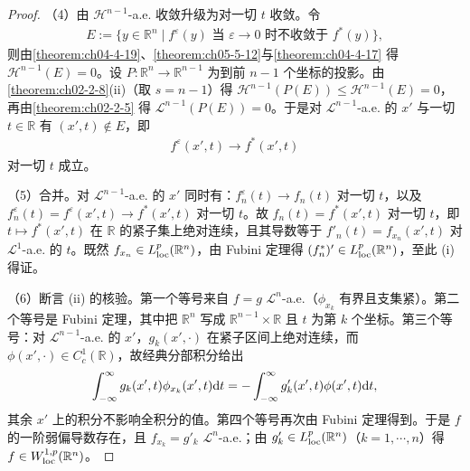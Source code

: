﻿\documentclass[../../main.tex]{subfiles}%
\begin{document}
\begin{proof}
（4）由 $\mathcal{H}^{n-1}$-a.e. 收敛升级为对一切 $t$ 收敛。令
\begin{align*}
E:=\bigl\{y\in\mathbb{R}^{n}\mid f^{\varepsilon}(y)\text{ 当 }\varepsilon\to0\text{ 时不收敛于 }f^{*}(y)\bigr\},
\end{align*}
则由\cref{theorem:ch04-4-19}、\cref{theorem:ch05-5-12}与\cref{theorem:ch04-4-17} 得 $\mathcal{H}^{n-1}(E)=0$。设 $P:\mathbb{R}^{n}\to\mathbb{R}^{n-1}$ 为到前 $n-1$ 个坐标的投影。由\cref{theorem:ch02-2-8}(ii)（取 $s=n-1$）得 $\mathcal{H}^{n-1}(P(E))\leqslant\mathcal{H}^{n-1}(E)=0$，再由\cref{theorem:ch02-2-5} 得 $\mathcal{L}^{n-1}(P(E))=0$。于是对 $\mathcal{L}^{n-1}$-a.e. 的 $x'$ 与一切 $t\in\mathbb{R}$ 有 $(x',t)\notin E$，即 %
\begin{align*}
f^{\varepsilon}(x',t)\to f^{*}(x',t)
\end{align*}
对一切 $t$ 成立。

（5）合并。对 $\mathcal{L}^{n-1}$-a.e. 的 $x'$ 同时有：$f^{\varepsilon}_{n}(t)\to f_{n}(t)$ 对一切 $t$，以及 $f^{\varepsilon}_{n}(t)=f^{\varepsilon}(x',t)\to f^{*}(x',t)$ 对一切 $t$。故 $f_{n}(t)=f^{*}(x',t)$ 对一切 $t$，即 $t\mapsto f^{*}(x',t)$ 在 $\mathbb{R}$ 的紧子集上绝对连续，且其导数等于 $f'_{n}(t)=f_{x_{n}}(x',t)$ 对 $\mathcal{L}^{1}$-a.e. 的 $t$。既然 $f_{x_{n}}\in L^{p}_{\mathrm{loc}}(\mathbb{R}^{n})$，由 Fubini 定理得 $(f^{*}_{n})'\in L^{p}_{\mathrm{loc}}(\mathbb{R}^{n})$，至此 (i) 得证。

（6）断言 (ii) 的核验。第一个等号来自 $f=g$ $\mathcal{L}^{n}$-a.e.（$\phi_{x_{k}}$ 有界且支集紧）。第二个等号是 Fubini 定理，其中把 $\mathbb{R}^{n}$ 写成 $\mathbb{R}^{n-1}\times\mathbb{R}$ 且 $t$ 为第 $k$ 个坐标。第三个等号：对 $\mathcal{L}^{n-1}$-a.e. 的 $x'$，$g_{k}(x',\cdot)$ 在紧子区间上绝对连续，而 $\phi(x',\cdot)\in C^{1}_{c}(\mathbb{R})$，故经典分部积分给出
\begin{align*}
\int_{-\infty}^{\infty}g_{k}(x',t)\phi_{x_{k}}(x',t)\mathrm{d} t=-\int_{-\infty}^{\infty}g'_{k}(x',t)\phi(x',t)\mathrm{d} t ,
\end{align*}
其余 $x'$ 上的积分不影响全积分的值。第四个等号再次由 Fubini 定理得到。于是 $f$ 的一阶弱偏导数存在，且 $f_{x_{k}}=g'_{k}$ $\mathcal{L}^{n}$-a.e.；由 $g'_{k}\in L^{p}_{\mathrm{loc}}(\mathbb{R}^{n})$（$k=1,\cdots,n$）得 $f\in W^{1,p}_{\mathrm{loc}}(\mathbb{R}^{n})$。
\end{proof}
\end{document}
